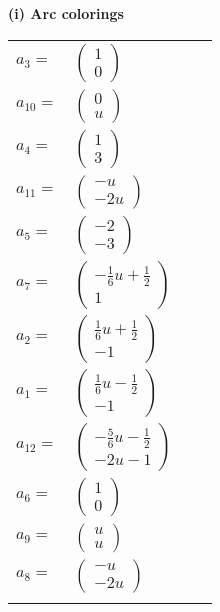 \documentclass[1p]{elsarticle_modified}
\theoremstyle{definition}
\begin{document}
\flushleft \textbf{(i) Arc colorings}\\
\begin{tabular}{m{7pt} m{180pt} m{7pt} m{180pt} }
\flushright $a_{3}=$&$\begin{pmatrix}1\\0\end{pmatrix}$ \\
\flushright $a_{10}=$&$\begin{pmatrix}0\\u\end{pmatrix}$ \\
\flushright $a_{4}=$&$\begin{pmatrix}1\\3\end{pmatrix}$ \\
\flushright $a_{11}=$&$\begin{pmatrix}- u\\-2 u\end{pmatrix}$ \\
\flushright $a_{5}=$&$\begin{pmatrix}-2\\-3\end{pmatrix}$ \\
\flushright $a_{7}=$&$\begin{pmatrix}-\frac{1}{6} u+\frac{1}{2}\\1\end{pmatrix}$ \\
\flushright $a_{2}=$&$\begin{pmatrix}\frac{1}{6} u+\frac{1}{2}\\-1\end{pmatrix}$ \\
\flushright $a_{1}=$&$\begin{pmatrix}\frac{1}{6} u-\frac{1}{2}\\-1\end{pmatrix}$ \\
\flushright $a_{12}=$&$\begin{pmatrix}-\frac{5}{6} u-\frac{1}{2}\\-2 u-1\end{pmatrix}$ \\
\flushright $a_{6}=$&$\begin{pmatrix}1\\0\end{pmatrix}$ \\
\flushright $a_{9}=$&$\begin{pmatrix}u\\u\end{pmatrix}$ \\
\flushright $a_{8}=$&$\begin{pmatrix}- u\\-2 u\end{pmatrix}$\\&\end{tabular}
\end{document}
